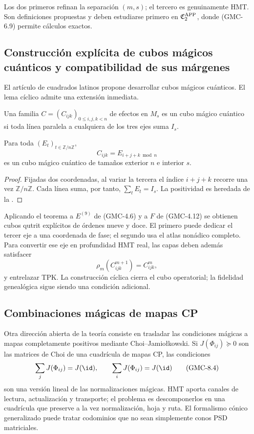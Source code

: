 Los dos primeros refinan la separación $(m,s)$; el tercero es genuinamente
HMT. Son definiciones propuestas y deben estudiarse primero en
$\mathfrak C_2^{\rm APP}$, donde \textup{(GMC-6.9)} permite cálculos exactos.

\subsection{Construcción explícita de cubos mágicos cuánticos y compatibilidad de sus márgenes}

El artículo de cuadrados latinos propone desarrollar cubos mágicos cuánticos.
El lema cíclico admite una extensión inmediata.

\begin{definition}
Una familia
$C=(C_{ijk})_{0\le i,j,k<n}$ de efectos en $M_s$ es un cubo mágico cuántico
si toda línea paralela a cualquiera de los tres ejes suma $I_s$.
\end{definition}

\begin{theorem}
\label{p12-83-c22-s5:gmc:thm:cubo-ciclico}
Para toda \POVM $(E_t)_{t\in\mathbb Z/n\mathbb Z}$,
\[
 C_{ijk}=E_{i+j+k\bmod n}
 \tag{GMC-8.2}
\]
es un cubo mágico cuántico de tamaños exterior $n$ e interior $s$.
\end{theorem}

\begin{proof}
Fijadas dos coordenadas, al variar la tercera el índice
$i+j+k$ recorre una vez $\mathbb Z/n\mathbb Z$. Cada línea suma, por tanto,
$\sum_tE_t=I_s$. La positividad es heredada de la \POVM.
\end{proof}

Aplicando el teorema a $E^{(9)}$ de \textup{(GMC-4.6)} y a $F$ de
\textup{(GMC-4.12)} se obtienen cubos qutrit explícitos de órdenes nueve y doce. El
primero puede dedicar el tercer eje a una coordenada de fase; el segundo usa
el atlas nonádico completo. Para convertir ese eje en profundidad HMT real,
las capas deben además satisfacer
\[
 \rho_m(C^{m+1}_{ijk})=C^m_{ijk},
 \tag{GMC-8.3}
\]
y entrelazar TPK. La construcción cíclica cierra el cubo operatorial; la
fidelidad genealógica sigue siendo una condición adicional.

\subsection{Combinaciones mágicas de mapas CP}

Otra dirección abierta de la teoría consiste en trasladar las condiciones
mágicas a mapas completamente positivos mediante Choi--Jamiołkowski. Si
$J(\Phi_{ij})\succeq0$ son las matrices de Choi de una cuadrícula de mapas CP,
las condiciones
\[
 \sum_jJ(\Phi_{ij})=J(\id),
 \qquad
 \sum_iJ(\Phi_{ij})=J(\id)
 \tag{GMC-8.4}
\]
son una versión lineal de las normalizaciones mágicas. HMT aporta canales de
lectura, actualización y transporte; el problema es descomponerlos en una
cuadrícula que preserve a la vez normalización, hoja y ruta. El formalismo
cónico generalizado puede tratar codominios que no sean simplemente conos
PSD matriciales.

